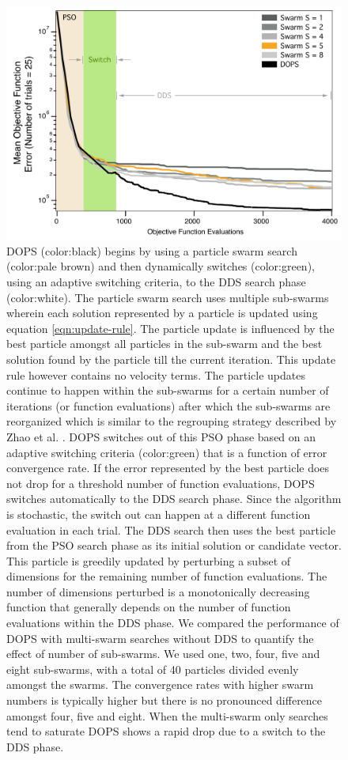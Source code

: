 \documentclass[12pt]{article}
\begin{document}
\begin{figure}[h]
\centering
\includegraphics[width=1.0\textwidth]{./figs/Figure_7_ErrorSwarms_v2.pdf}
\caption{DOPS (color:black) begins by using a particle swarm search (color:pale brown) and then dynamically switches (color:green), using an adaptive switching criteria, to the DDS search phase (color:white).
The particle swarm search uses multiple sub-swarms wherein each solution represented by a particle is updated using equation \ref{eqn:update-rule}. The particle update is influenced by the best particle amongst all particles in the sub-swarm and the best solution found by the particle till the current iteration. This update rule however contains no velocity terms. The particle updates continue to happen within the sub-swarms for a certain number of iterations (or function evaluations) after which the sub-swarms are reorganized which is similar to the regrouping strategy described by Zhao et al. \cite{zhao2008dynamic}. DOPS switches out of this PSO phase based on an adaptive switching criteria (color:green) that is a function of error convergence rate. If the error represented by the best particle does not drop for a threshold number of function evaluations, DOPS switches automatically to the DDS search phase. Since the algorithm is stochastic, the switch out can happen at a different function evaluation in each trial. The DDS search then uses the best particle from the PSO search phase as its initial solution or candidate vector. This particle is greedily updated by perturbing a subset of dimensions for the remaining number of function evaluations. The number of dimensions perturbed is a monotonically decreasing function that generally depends on the number of function evaluations within the DDS phase.  
We compared the performance of DOPS with multi-swarm searches without DDS to quantify the effect of number of sub-swarms. We used one, two, four, five and eight sub-swarms, with a total of 40 particles divided evenly amongst the swarms. The convergence rates with higher swarm numbers is typically higher but there is no pronounced difference amongst four, five and eight. When the multi-swarm only searches tend to saturate DOPS shows a rapid drop due to a switch to  the DDS phase. 
}\label{fig-sub-swarms}
\end{figure}
\end{document}
